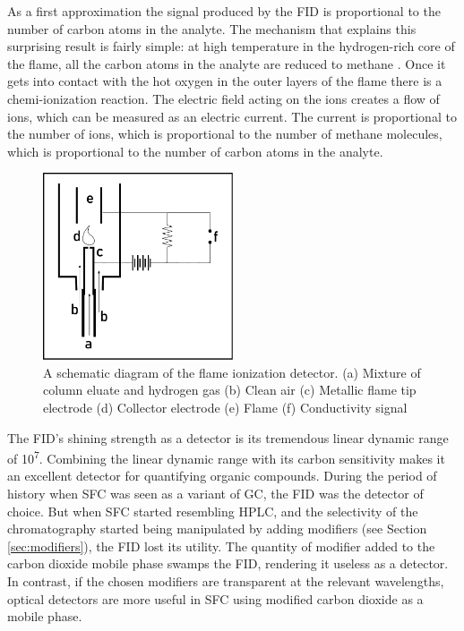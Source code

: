As a first approximation the signal produced by the FID is proportional to the
number of carbon atoms in the analyte. The mechanism that explains this
surprising result is fairly simple: at high temperature in the hydrogen-rich
core of the flame, all the carbon atoms in the analyte are reduced to methane
\autocite{Holm1996}. Once it gets into contact with the hot oxygen in the outer
layers of the flame there is a chemi-ionization reaction. The electric field
acting on the ions creates a flow of ions, which can be measured as an electric
current. The current is proportional to the number of ions, which is
proportional to the number of methane molecules, which is proportional to the
number of carbon atoms in the analyte.

\begin{figure}[hptb]
\centering
\includegraphics[width=0.5\textwidth]{Figures/FIDSchematic.pdf}
\decoRule

\caption[FID diagram]{A schematic diagram of the flame ionization detector. (a)
Mixture of column eluate and hydrogen gas (b) Clean air (c) Metallic flame tip
electrode (d) Collector electrode (e) Flame (f) Conductivity signal}

\label{fig:fiddiagram}

\end{figure}

The FID's shining strength as a detector is its tremendous linear dynamic range
of 10\textsuperscript{7}. Combining the linear dynamic range with its carbon
sensitivity makes it an excellent detector for quantifying organic compounds.
During the period of history when SFC was seen as a variant of GC, the FID was
the detector of choice. But when SFC started resembling HPLC, and the
selectivity of the chromatography started being manipulated by adding modifiers
(see Section \ref{sec:modifiers}), the FID lost its utility. The quantity of
modifier added to the carbon dioxide mobile phase swamps the FID,
rendering it useless as a detector. In contrast, if the chosen modifiers are
transparent at the relevant wavelengths, optical detectors are more useful in
SFC using modified carbon dioxide as a mobile phase.

